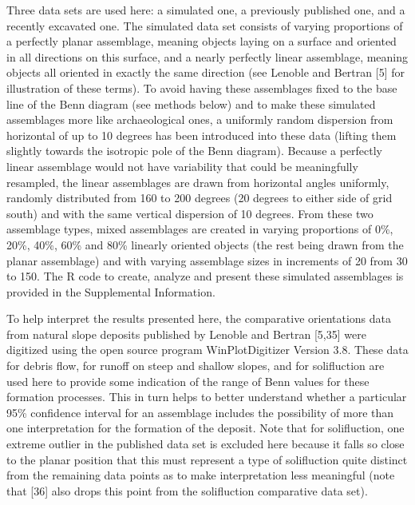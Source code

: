 \documentclass[]{article}
\begin{document}
Three data sets are used here: a simulated one, a previously published
one, and a recently excavated one. The simulated data set consists of
varying proportions of a perfectly planar assemblage, meaning objects
laying on a surface and oriented in all directions on this surface, and
a nearly perfectly linear assemblage, meaning objects all oriented in
exactly the same direction (see Lenoble and Bertran {[}5{]} for
illustration of these terms). To avoid having these assemblages fixed to
the base line of the Benn diagram (see methods below) and to make these
simulated assemblages more like archaeological ones, a uniformly random
dispersion from horizontal of up to 10 degrees has been introduced into
these data (lifting them slightly towards the isotropic pole of the Benn
diagram). Because a perfectly linear assemblage would not have
variability that could be meaningfully resampled, the linear assemblages
are drawn from horizontal angles uniformly, randomly distributed from
160 to 200 degrees (20 degrees to either side of grid south) and with
the same vertical dispersion of 10 degrees. From these two assemblage
types, mixed assemblages are created in varying proportions of 0\%,
20\%, 40\%, 60\% and 80\% linearly oriented objects (the rest being
drawn from the planar assemblage) and with varying assemblage sizes in
increments of 20 from 30 to 150. The R code to create, analyze and
present these simulated assemblages is provided in the Supplemental
Information.

To help interpret the results presented here, the comparative
orientations data from natural slope deposits published by Lenoble and
Bertran {[}5,35{]} were digitized using the open source program
WinPlotDigitizer Version 3.8. These data for debris flow, for runoff on
steep and shallow slopes, and for solifluction are used here to provide
some indication of the range of Benn values for these formation
processes. This in turn helps to better understand whether a particular
95\% confidence interval for an assemblage includes the possibility of
more than one interpretation for the formation of the deposit. Note that
for solifluction, one extreme outlier in the published data set is
excluded here because it falls so close to the planar position that this
must represent a type of solifluction quite distinct from the remaining
data points as to make interpretation less meaningful (note that
{[}36{]} also drops this point from the solifluction comparative data
set).
\end{document}
